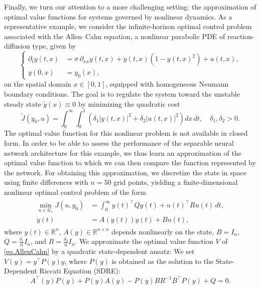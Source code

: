 \documentclass{article}
\begin{document}
Finally, we turn our attention to a more challenging setting: the approximation of optimal value functions for systems governed by nonlinear dynamics. As a representative example, we consider the infinite-horizon optimal control problem associated with the Allen--Cahn equation, a nonlinear parabolic PDE of reaction-diffusion type, given by
\begin{equation*}
\left\{
\begin{aligned}
\partial_t y(t,x) &= \sigma\, \partial_{xx} y(t,x) + y(t,x)(1 - y(t,x)^2) + u(t,x), \\
y(0,x) &= y_0(x),
\end{aligned}
\right.
\end{equation*}
on the spatial domain \( x \in [0,1] \), equipped with homogeneous Neumann boundary conditions. The goal is to regulate the system toward the unstable steady state \( \tilde{y}(x) \equiv 0 \) by minimizing the quadratic cost
\[
\tilde{J}(y_0, u) = \int_0^\infty \int_0^1 \left( \delta_1 |y(t,x)|^2 + \delta_2|u(t,x)|^2 \right) dx \, dt, \quad \delta_1,\delta_2 >0.
\]
The optimal value function for this nonlinear problem is not available in closed form. In order to be able to assess the performance of the separable neural network architecture for this example, we thus learn an approximation of the optimal value function to which we can then compare the function represented by the network. For obtaining this approximation, we discretize the state in space using finite differences with \( n = 50 \) grid points, yielding a finite-dimensional nonlinear optimal control problem of the form
\begin{align} 
    \begin{split} \label{eq.AllenCahn}
        \min_{u \in \mathcal{U}_c} J(u, y_0) & =  \int_0^\infty  y(t)^\top Q y(t) +  u(t)^\top R u(t) \, dt,\\
        \dot{y}(t) & = A(y(t)) y(t) + B u(t),
    \end{split}
\end{align}
where \( y(t) \in \mathbb{R}^n \), \( A(y) \in \mathbb{R}^{n \times n} \) depends nonlinearly on the state, \( B = I_n\), $Q = \frac{\delta_1}{n} I_n$, and $R= \frac{\delta_2}{n} I_n $. We approximate the optimal value function \( V \) of \eqref{eq.AllenCahn} by a quadratic state-dependent ansatz: We set $V(y) = y^\top P(y) y $, 
where \( P(y) \) is obtained as the solution to the State-Dependent Riccati Equation (SDRE):
\begin{equation}
A^\top(y) P(y) + P(y) A(y) - P(y) B R^{-1} B^\top P(y) + Q = 0.
\label{SDRE}
\end{equation}
\end{document}
